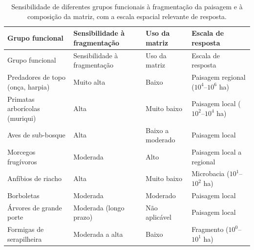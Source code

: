 \documentclass[
  portuguese,
  11pt,
  a4paper,
  open=any]{scrbook}
\begin{document}
\begin{longtable}[]{@{}
  >{\raggedright\arraybackslash}p{}
  >{\centering\arraybackslash}p{}
  >{\centering\arraybackslash}p{}
  >{\centering\arraybackslash}p{}@{}}
\caption{Sensibilidade de diferentes grupos funcionais à fragmentação da
paisagem e à composição da matriz, com a escala espacial relevante de
resposta.}\label{tbl-sensibilidade}\tabularnewline
\toprule\noalign{}
\begin{minipage}[b]{\linewidth}\raggedright
Grupo funcional
\end{minipage} & \begin{minipage}[b]{\linewidth}\centering
Sensibilidade à fragmentação
\end{minipage} & \begin{minipage}[b]{\linewidth}\centering
Uso da matriz
\end{minipage} & \begin{minipage}[b]{\linewidth}\centering
Escala de resposta
\end{minipage} \\
\midrule\noalign{}
\endfirsthead
\toprule\noalign{}
\begin{minipage}[b]{\linewidth}\raggedright
Grupo funcional
\end{minipage} & \begin{minipage}[b]{\linewidth}\centering
Sensibilidade à fragmentação
\end{minipage} & \begin{minipage}[b]{\linewidth}\centering
Uso da matriz
\end{minipage} & \begin{minipage}[b]{\linewidth}\centering
Escala de resposta
\end{minipage} \\
\midrule\noalign{}
\endhead
\bottomrule\noalign{}
\endlastfoot
Predadores de topo (onça, harpia) & Muito alta & Baixo & Paisagem
regional (\(10^4\)--\(10^6\) ha) \\
Primatas arborícolas (muriqui) & Alta & Muito baixo & Paisagem local
(\(10^2\)--\(10^4\) ha) \\
Aves de sub-bosque & Alta & Baixo a moderado & Paisagem local \\
Morcegos frugívoros & Moderada & Alto & Paisagem local a regional \\
Anfíbios de riacho & Alta & Muito baixo & Microbacia (\(10^1\)--\(10^2\)
ha) \\
Borboletas & Moderada & Moderado & Paisagem local \\
Árvores de grande porte & Moderada (longo prazo) & Não aplicável &
Paisagem local \\
Formigas de serapilheira & Moderada a alta & Baixo & Fragmento
(\(10^0\)--\(10^1\) ha) \\
\end{longtable}
\end{document}
